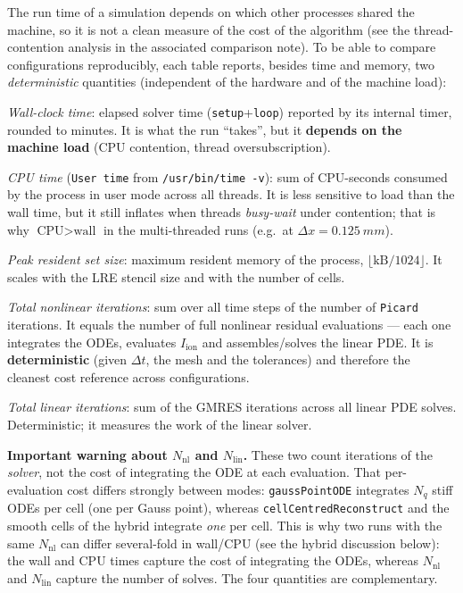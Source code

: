 \documentclass[11pt,a4paper]{article}
\newcommand{\code}[1]{\texttt{\small #1}}
\newcommand{\Iion}{I_{\mathrm{ion}}}
\begin{document}
The run time of a simulation depends on which other processes shared the
machine, so it is not a clean measure of the cost of the algorithm (see the
thread-contention analysis in the associated comparison note). To be able to compare
configurations reproducibly, each table reports, besides time and
memory, two \emph{deterministic} quantities (independent of the hardware and of the
machine load):

\begin{description}[topsep=2pt,itemsep=2pt,leftmargin=1.4em]
  \item[wall {[min]}] \emph{Wall-clock time}: elapsed solver time
        (\code{setup}+\code{loop}) reported by its internal timer, rounded to
        minutes. It is what the run ``takes'', but it \textbf{depends on the machine
        load} (CPU contention, thread oversubscription).
  \item[CPU {[min]}] \emph{CPU time} (\code{User time} from
        \texttt{/usr/bin/time -v}): sum of CPU-seconds consumed by the process in
        user mode across all threads. It is less sensitive to load than the
        wall time, but it still inflates when threads \emph{busy-wait} under
        contention; that is why $\text{CPU}>\text{wall}$ in the multi-threaded runs (e.g.\
        at $\Delta x=\SI{0.125}{mm}$).
  \item[RSS {[MiB]}] \emph{Peak resident set size}: maximum resident memory of the
        process, $\lfloor\text{kB}/1024\rfloor$. It scales with the LRE stencil size
        and with the number of cells.
  \item[$N_{\mathrm{nl}}$] \emph{Total nonlinear iterations}: sum over all
        time steps of the number of \code{Picard} iterations. It equals the
        number of full nonlinear residual evaluations --- each one integrates
        the ODEs, evaluates $\Iion$ and assembles/solves the linear PDE. It is
        \textbf{deterministic} (given $\Delta t$, the mesh and the tolerances) and
        therefore the cleanest cost reference across configurations.
  \item[$N_{\mathrm{lin}}$] \emph{Total linear iterations}: sum of the
        GMRES iterations across all linear PDE solves.
        Deterministic; it measures the work of the linear solver.
\end{description}

\noindent\textbf{Important warning about $N_{\mathrm{nl}}$ and $N_{\mathrm{lin}}$.}
These two count iterations of the \emph{solver}, not the cost of integrating the ODE at
each evaluation. That per-evaluation cost differs strongly between modes:
\code{gaussPointODE} integrates $N_q$ stiff ODEs per cell (one per Gauss point),
whereas \code{cellCentredReconstruct} and the smooth cells of the hybrid integrate
\emph{one} per cell. This is why two runs with the same $N_{\mathrm{nl}}$ can
differ several-fold in wall/CPU (see the hybrid discussion below): the
wall and CPU times capture the cost of integrating the ODEs, whereas
$N_{\mathrm{nl}}$ and $N_{\mathrm{lin}}$ capture the number of solves. The four
quantities are complementary.
\end{document}
